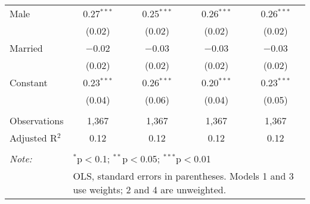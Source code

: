\begin{table}[!htbp]
\begin{tabular}{@{\extracolsep{5pt}}lcccc}
  Male & 0.27$^{***}$ & 0.25$^{***}$ & 0.26$^{***}$ & 0.26$^{***}$ \\ 
  & (0.02) & (0.02) & (0.02) & (0.02) \\ 
  Married & $-$0.02 & $-$0.03 & $-$0.03 & $-$0.03 \\ 
  & (0.02) & (0.02) & (0.02) & (0.02) \\ 
  Constant & 0.23$^{***}$ & 0.26$^{***}$ & 0.20$^{***}$ & 0.23$^{***}$ \\ 
  & (0.04) & (0.06) & (0.04) & (0.05) \\ 
 \hline \\[-1.8ex] 
Observations & 1,367 & 1,367 & 1,367 & 1,367 \\ 
Adjusted R$^{2}$ & 0.12 & 0.12 & 0.12 & 0.12 \\ 
\hline 
\hline \\[-1.8ex] 
\textit{Note:}  & \multicolumn{4}{l}{$^{*}$p$<$0.1; $^{**}$p$<$0.05; $^{***}$p$<$0.01} \\ 
 & \multicolumn{4}{l}{OLS, standard errors in parentheses. Models 1 and 3 use weights; 2 and 4 are unweighted.} \\ 
\end{tabular} 
\end{table} 
